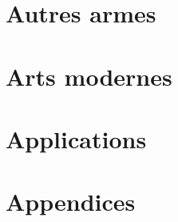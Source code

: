 \documentclass[10pt, a4paper, oneside, titlepage]{book}
\begin{document}


% 
% 
% 


\part{Autres armes}





\part{Arts modernes}


% 


\part{Applications}
\label{part:applications}



% 




\appendix


\part{Appendices}







\printbibliography[heading=bibintoc]
\printindex
\end{document}

